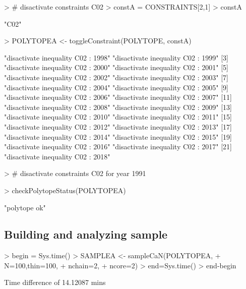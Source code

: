 \documentclass{article}
\begin{document}
\begin{Schunk}
\begin{Sinput}
> # disactivate constraints C02
> constA = CONSTRAINTS[2,1]
> constA
\end{Sinput}
\begin{Soutput}
[1] "C02"
\end{Soutput}
\begin{Sinput}
> POLYTOPEA <- toggleConstraint(POLYTOPE, constA)
\end{Sinput}
\begin{Soutput}
 [1] "disactivate inequality C02 : 1998" "disactivate inequality C02 : 1999"
 [3] "disactivate inequality C02 : 2000" "disactivate inequality C02 : 2001"
 [5] "disactivate inequality C02 : 2002" "disactivate inequality C02 : 2003"
 [7] "disactivate inequality C02 : 2004" "disactivate inequality C02 : 2005"
 [9] "disactivate inequality C02 : 2006" "disactivate inequality C02 : 2007"
[11] "disactivate inequality C02 : 2008" "disactivate inequality C02 : 2009"
[13] "disactivate inequality C02 : 2010" "disactivate inequality C02 : 2011"
[15] "disactivate inequality C02 : 2012" "disactivate inequality C02 : 2013"
[17] "disactivate inequality C02 : 2014" "disactivate inequality C02 : 2015"
[19] "disactivate inequality C02 : 2016" "disactivate inequality C02 : 2017"
[21] "disactivate inequality C02 : 2018"
\end{Soutput}
\begin{Sinput}
> # disactivate constraints C02 for year 1991
\end{Sinput}
\end{Schunk}

\begin{Schunk}
\begin{Sinput}
> checkPolytopeStatus(POLYTOPEA)
\end{Sinput}
\begin{Soutput}
[1] "polytope ok"
\end{Soutput}
\end{Schunk}

\subsection{Building and analyzing sample}

\begin{Schunk}
\begin{Sinput}
> begin = Sys.time()
> SAMPLEA <- sampleCaN(POLYTOPEA, 
+                       N=100,thin=100, 
+                       nchain=2,
+                       ncore=2)
> end=Sys.time()
> end-begin
\end{Sinput}
\begin{Soutput}
Time difference of 14.12087 mins
\end{Soutput}
\end{Schunk}
\end{document}
